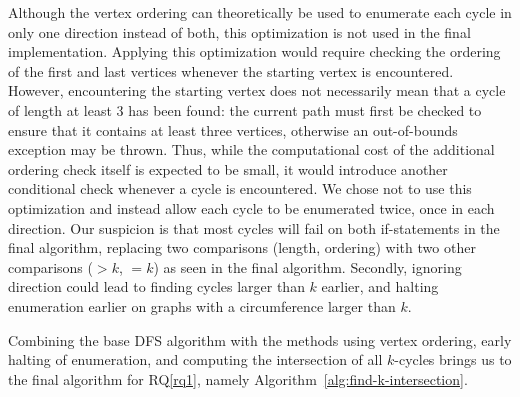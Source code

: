 Although the vertex ordering can theoretically be used to enumerate each cycle in only one direction instead of both, this optimization is not used in the final implementation. Applying this optimization would require checking the ordering of the first and last vertices whenever the starting vertex is encountered. However, encountering the starting vertex does not necessarily mean that a cycle of length at least 3 has been found: the current path must first be checked to ensure that it contains at least three vertices, otherwise an out-of-bounds exception may be thrown. Thus, while the computational cost of the additional ordering check itself is expected to be small, it would introduce another conditional check whenever a cycle is encountered. We chose not to use this optimization and instead allow each cycle to be enumerated twice, once in each direction. Our suspicion is that most cycles will fail on both if-statements in the final algorithm, replacing two comparisons (length, ordering) with two other comparisons ($>k$, $=k$) as seen in the final algorithm. Secondly, ignoring direction could lead to finding cycles larger than $k$ earlier, and halting enumeration earlier on graphs with a circumference larger than $k$.

Combining the base DFS algorithm with the methods using vertex ordering, early halting of enumeration, and computing the intersection of all $k$-cycles brings us to the final algorithm for RQ\ref{rq1}, namely Algorithm~\ref{alg:find-k-intersection}.

